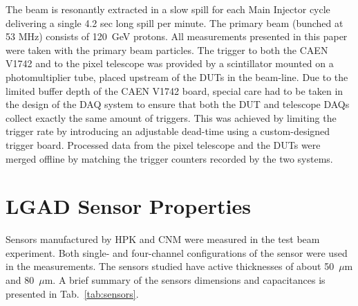 \documentclass[preprint,1p]{elsarticle}
\begin{document}
The beam is resonantly extracted in a slow spill for each Main Injector cycle
delivering a single 4.2 sec long spill per minute. The primary beam (bunched at
53 MHz) consists of 120~GeV protons. All measurements presented in this paper
were taken with the primary beam particles. The trigger to both the CAEN V1742
and to the pixel telescope was provided by a scintillator mounted on a
photomultiplier tube, placed upstream of the DUTs in the beam-line. Due to the
limited buffer depth of the CAEN V1742 board, special care had to be taken in
the design of the DAQ system to ensure that both the DUT and telescope DAQs
collect exactly the same amount of triggers. This was achieved by limiting the
trigger rate by introducing an adjustable dead-time using a custom-designed
trigger board. Processed data from the pixel telescope and the DUTs were
merged offline by matching the trigger counters recorded by the two systems.




\section{LGAD Sensor Properties}
\label{sec:sensors}

Sensors manufactured by HPK and CNM were measured in the test beam
experiment. Both single- and four-channel configurations of the sensor were used
in the measurements. The sensors studied have active thicknesses of
about 50~$\mu$m and 80~$\mu$m. A brief summary of the sensors dimensions and
capacitances is presented in Tab.~\ref{tab:sensors}.
\end{document}
